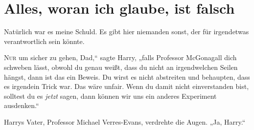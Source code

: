 \chapter{Alles, woran ich glaube, ist falsch}

\begin{chapterOpeningQuote}
Natürlich war es meine Schuld. Es gibt hier niemanden sonst, der für irgendetwas verantwortlich sein könnte.
\end{chapterOpeningQuote}

\lettrine[ante=„]{N}{ur} um sicher zu gehen, Dad,“ sagte Harry, „falls Professor McGonagall dich schweben lässt, obwohl du genau weißt, dass du nicht an irgendwelchen Seilen hängst, dann ist das ein Beweis. Du wirst es nicht abstreiten und behaupten, dass es irgendein Trick war. Das wäre unfair. Wenn du damit nicht einverstanden bist, solltest du es \emph{jetzt} sagen, dann können wir uns ein anderes Experiment ausdenken.“

Harrys Vater, Professor Michael Verres-Evans, verdrehte die Augen. „Ja, Harry.“

